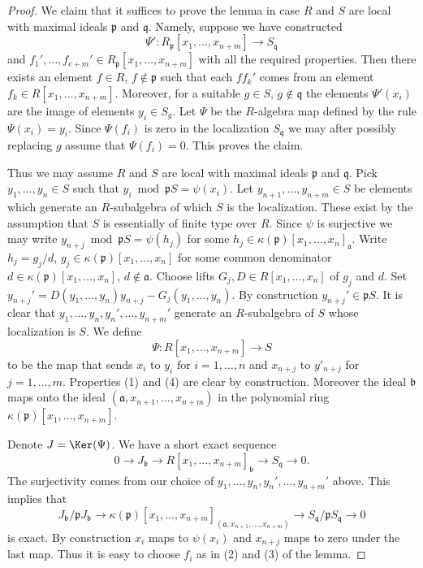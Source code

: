 \begin{proof}
We claim that it suffices to prove the lemma in case $R$
and $S$ are local with maximal ideals $\mathfrak p$ and $\mathfrak q$.
Namely, suppose we have constructed
$$
\Psi' : R_{\mathfrak p}[x_1, \ldots, x_{n + m}]
\longrightarrow
S_{\mathfrak q}
$$
and $f_1', \ldots, f_{e + m}' \in R_{\mathfrak p}[x_1, \ldots, x_{n + m}]$
with all the required properties. Then there exists an element
$f \in R$, $f \not \in \mathfrak p$ such that each
$ff_k'$ comes from an element $f_k \in R[x_1, \ldots, x_{n + m}]$.
Moreover, for a suitable $g \in S$, $g \not \in \mathfrak q$
the elements $\Psi'(x_i)$ are the image of elements
$y_i \in S_g$. Let $\Psi$ be the $R$-algebra map defined
by the rule $\Psi(x_i) = y_i$. Since $\Psi(f_i)$ is zero
in the localization $S_{\mathfrak q}$ we may after possibly
replacing $g$ assume that $\Psi(f_i) = 0$. This proves the claim.

\medskip\noindent
Thus we may assume $R$ and $S$ are local
with maximal ideals $\mathfrak p$ and $\mathfrak q$.
Pick $y_1, \ldots, y_n \in S$ such that
$y_i \bmod \mathfrak pS = \psi(x_i)$.
Let $y_{n + 1}, \ldots, y_{n + m} \in S$ be elements which generate
an $R$-subalgebra of which $S$ is the localization.
These exist by the assumption that $S$ is essentially of
finite type over $R$. Since $\psi$ is surjective we
may write $y_{n + j} \bmod \mathfrak pS = \psi(h_j)$ for
some $h_j \in \kappa(\mathfrak p)[x_1, \ldots, x_n]_{\mathfrak a}$.
Write $h_j = g_j/d$, $g_j \in \kappa(\mathfrak p)[x_1, \ldots, x_n]$
for some common denominator $d \in \kappa(\mathfrak p)[x_1, \ldots, x_n]$,
$d \not \in \mathfrak a$. Choose lifts $G_j, D \in R[x_1, \ldots, x_n]$
of $g_j$ and $d$. Set
$y_{n + j}' = D(y_1, \ldots, y_n) y_{n + j} - G_j(y_1, \ldots, y_n)$.
By construction $y_{n + j}' \in \mathfrak p S$.
It is clear that $y_1, \ldots, y_n, y_n', \ldots, y_{n + m}'$
generate an $R$-subalgebra of $S$ whose localization is $S$.
We define
$$
\Psi : R[x_1, \ldots, x_{n + m}] \to S
$$
to be the map that sends $x_i$ to $y_i$ for $i = 1, \ldots, n$
and $x_{n + j}$ to $y'_{n + j}$ for $j = 1, \ldots, m$. Properties
(1) and (4) are clear by construction. Moreover the ideal
$\mathfrak b$ maps onto the ideal
$(\mathfrak a, x_{n + 1}, \ldots, x_{n + m})$
in the polynomial ring $\kappa(\mathfrak p)[x_1, \ldots, x_{n + m}]$.

\medskip\noindent
Denote $J = \Ker(\Psi)$. We have a short exact sequence
$$
0 \to J_{\mathfrak b}
\to R[x_1, \ldots, x_{n + m}]_{\mathfrak b}
\to S_{\mathfrak q}
\to 0.
$$
The surjectivity comes from our choice of
$y_1, \ldots, y_n, y_n', \ldots, y_{n + m}'$ above.
This implies that
$$
J_{\mathfrak b}/ \mathfrak pJ_{\mathfrak b}
\to \kappa(\mathfrak p)[x_1, \ldots, x_{n + m}]_{
(\mathfrak a, x_{n + 1}, \ldots, x_{n + m})}
\to S_{\mathfrak q}/\mathfrak pS_{\mathfrak q}
\to 0
$$
is exact. By construction $x_i$ maps to $\psi(x_i)$ and
$x_{n + j}$ maps to zero under the last map.
Thus it is easy to choose $f_i$ as in
(2) and (3) of the lemma.
\end{proof}


